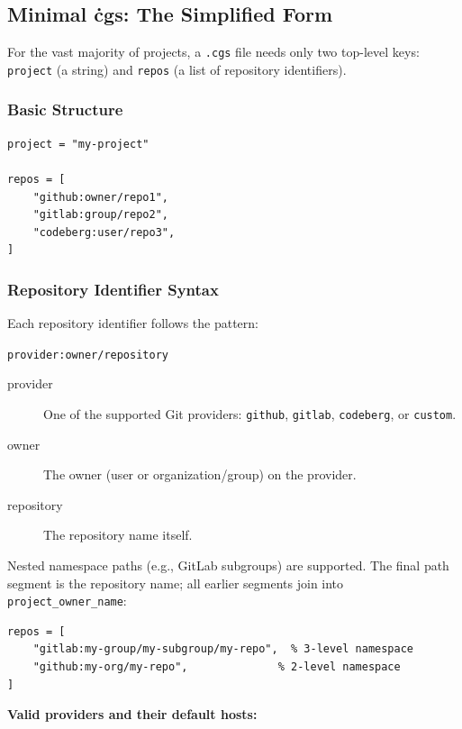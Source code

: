 \subsection{Minimal \.cgs: The Simplified Form}
\label{subsec:cgs-simplified}

For the vast majority of projects, a \texttt{.cgs} file needs only two top-level
keys: \texttt{project} (a string) and \texttt{repos} (a list of repository identifiers).

\subsubsection{Basic Structure}

\begin{lstlisting}
project = "my-project"

repos = [
    "github:owner/repo1",
    "gitlab:group/repo2",
    "codeberg:user/repo3",
]
\end{lstlisting}

\subsubsection{Repository Identifier Syntax}

Each repository identifier follows the pattern:

\begin{center}
\texttt{provider:owner/repository}
\end{center}

\begin{description}
  \item[provider] One of the supported Git providers: \texttt{github},
        \texttt{gitlab}, \texttt{codeberg}, or \texttt{custom}.
  \item[owner] The owner (user or organization/group) on the provider.
  \item[repository] The repository name itself.
\end{description}

Nested namespace paths (e.g., GitLab subgroups) are supported. The final path
segment is the repository name; all earlier segments join into
\texttt{project\_owner\_name}:

\begin{lstlisting}
repos = [
    "gitlab:my-group/my-subgroup/my-repo",  % 3-level namespace
    "github:my-org/my-repo",              % 2-level namespace
]
\end{lstlisting}

\textbf{Valid providers and their default hosts:}

